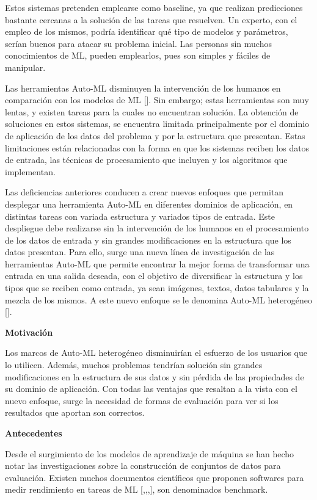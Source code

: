 Estos sistemas pretenden emplearse como baseline, ya que realizan predicciones bastante cercanas a la solución de las tareas que resuelven. Un experto, con el empleo de 
los mismos, podría identificar qué tipo de modelos y parámetros, serían buenos para atacar su problema inicial. Las personas sin muchos conocimientos de ML, pueden 
emplearlos, pues son simples y fáciles de manipular.

Las herramientas Auto-ML disminuyen la intervención de los humanos en comparación con los modelos de ML [\cite{36}]. Sin embargo; estas herramientas son muy lentas, y 
existen tareas para la cuales no encuentran solución. La obtención de soluciones en estos sistemas, se encuentra limitada principalmente por el dominio de aplicación de 
los datos del problema y por la estructura que presentan. Estas limitaciones están relacionadas con la forma en que los sistemas reciben los datos de entrada, las técnicas 
de procesamiento que incluyen y los algoritmos que implementan. 

Las deficiencias anteriores conducen a crear nuevos enfoques que permitan desplegar una herramienta Auto-ML en diferentes dominios de aplicación, en distintas tareas 
con variada estructura y variados tipos de entrada. Este despliegue debe realizarse sin la intervención de los humanos en el procesamiento de los datos de entrada y 
sin grandes modificaciones en la estructura que los datos presentan. Para ello, surge una nueva línea de investigación de las herramientas Auto-ML que permite encontrar 
la mejor forma de transformar una entrada en una salida deseada, con el objetivo de diversificar la estructura y los tipos que se reciben como entrada, ya sean imágenes, 
textos, datos tabulares y la mezcla de los mismos. A este nuevo enfoque se le denomina Auto-ML heterogéneo [\cite{33}].

\begin{flushleft} 
{\Large { \textbf{Motivación} }}
\end{flushleft}
Los marcos de Auto-ML heterogéneo disminuirían el esfuerzo de los usuarios que lo utilicen. Además, muchos problemas tendrían solución sin grandes modificaciones en 
la estructura de sus datos y sin pérdida de las propiedades de su dominio de aplicación. Con todas las ventajas que resaltan a la vista con el nuevo enfoque, 
surge la necesidad de formas de evaluación para ver si los resultados que aportan son correctos.

\begin{flushleft} 
    {\Large { \textbf{Antecedentes}}}
\end{flushleft}
Desde el surgimiento de los modelos de aprendizaje de máquina se han hecho notar las investigaciones sobre la construcción de conjuntos de datos para evaluación. 
Existen muchos documentos científicos que proponen softwares para medir rendimiento en tareas de ML [\cite{1},\cite{3},\cite{2},\cite{7}], son denominados benchmark.

